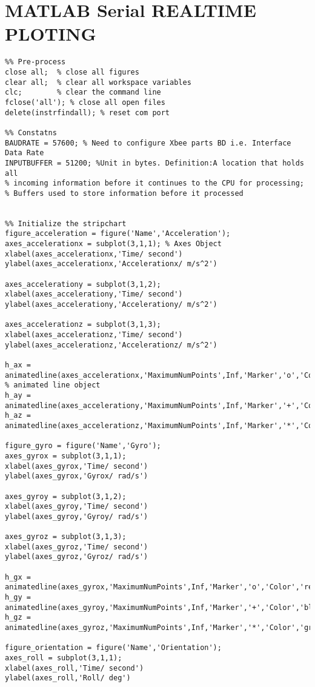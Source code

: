 \section{MATLAB Serial REALTIME PLOTING} 
\begin{lstlisting} 
%% Pre-process
close all;  % close all figures
clear all;  % clear all workspace variables
clc;        % clear the command line
fclose('all'); % close all open files
delete(instrfindall); % reset com port 

%% Constatns
BAUDRATE = 57600; % Need to configure Xbee parts BD i.e. Interface Data Rate
INPUTBUFFER = 51200; %Unit in bytes. Definition:A location that holds all 
% incoming information before it continues to the CPU for processing; 
% Buffers used to store information before it processed


%% Initialize the stripchart
figure_acceleration = figure('Name','Acceleration');
axes_accelerationx = subplot(3,1,1); % Axes Object
xlabel(axes_accelerationx,'Time/ second')
ylabel(axes_accelerationx,'Accelerationx/ m/s^2')

axes_accelerationy = subplot(3,1,2);
xlabel(axes_accelerationy,'Time/ second')
ylabel(axes_accelerationy,'Accelerationy/ m/s^2')

axes_accelerationz = subplot(3,1,3);
xlabel(axes_accelerationz,'Time/ second')
ylabel(axes_accelerationz,'Accelerationz/ m/s^2')

h_ax = animatedline(axes_accelerationx,'MaximumNumPoints',Inf,'Marker','o','Color','red'); % animated line object
h_ay = animatedline(axes_accelerationy,'MaximumNumPoints',Inf,'Marker','+','Color','blue');
h_az = animatedline(axes_accelerationz,'MaximumNumPoints',Inf,'Marker','*','Color','green');

figure_gyro = figure('Name','Gyro');
axes_gyrox = subplot(3,1,1);
xlabel(axes_gyrox,'Time/ second')
ylabel(axes_gyrox,'Gyrox/ rad/s')

axes_gyroy = subplot(3,1,2);
xlabel(axes_gyroy,'Time/ second')
ylabel(axes_gyroy,'Gyroy/ rad/s')

axes_gyroz = subplot(3,1,3);
xlabel(axes_gyroz,'Time/ second')
ylabel(axes_gyroz,'Gyroz/ rad/s')

h_gx = animatedline(axes_gyrox,'MaximumNumPoints',Inf,'Marker','o','Color','red');
h_gy = animatedline(axes_gyroy,'MaximumNumPoints',Inf,'Marker','+','Color','blue');
h_gz = animatedline(axes_gyroz,'MaximumNumPoints',Inf,'Marker','*','Color','green');

figure_orientation = figure('Name','Orientation');
axes_roll = subplot(3,1,1);
xlabel(axes_roll,'Time/ second')
ylabel(axes_roll,'Roll/ deg')


\end{lstlisting}
